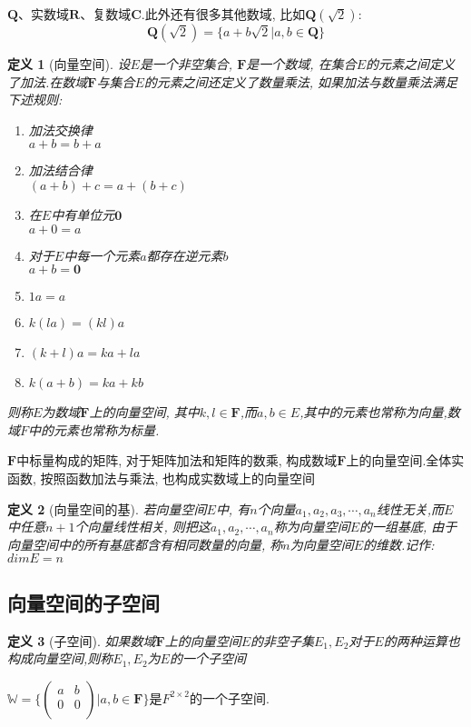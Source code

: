 \documentclass{book}
\newtheorem{definition}{\hspace{2em}定义}[section]
\begin{document}
$\mathbf{Q}$、实数域$\mathbf{R}$、复数域$\mathbf{C}$.此外还有很多其他数域, 比如$\mathbf{Q}(\sqrt{2})$:
\begin{equation*}
  \mathbf{Q}(\sqrt{2})=\{a+b\sqrt{2}|a,b\in\mathbf{Q}\}
\end{equation*}
\begin{definition}[向量空间]
  设$E$是一个非空集合, $\mathbf{F}$是一个数域, 在集合$E$的元素之间定义了加法.在数域$\mathbf{F}$与集合$E$的元素之间还定义了数量乘法, 如果加法与数量乘法满足下述规则:
  \begin{enumerate}[(1)]
    \item 加法交换律\\$a+b=b+a$
    \item 加法结合律\\$(a+b)+c=a+(b+c)$
    \item 在$E$中有单位元$\mathbf{0}$\\$a+0=a$
    \item 对于$E$中每一个元素$a$都存在逆元素$b$\\$a+b=\mathbf{0}$
    \item $1a=a$
    \item $k(la)=(kl)a$
    \item $(k+l)a=ka+la$
    \item $k(a+b)=ka+kb$
  \end{enumerate}
  则称$E$为数域$\mathbf{F}$上的向量空间, 其中$k,l\in \mathbf{F}$,而$a,b\in E$,其中的元素也常称为向量,数域$F$中的元素也常称为标量.
\end{definition}
$\mathbf{F}$中标量构成的矩阵, 对于矩阵加法和矩阵的数乘, 构成数域$\mathbf{F}$上的向量空间.全体实函数, 按照函数加法与乘法, 也构成实数域上的向量空间
\begin{definition}[向量空间的基]
  若向量空间$E$中, 有$n$个向量$a_1,a_2,a_3,\cdots,a_n$线性无关,而$E$中任意$n+1$个向量线性相关, 则把这$a_1,a_2,\cdots,a_n$称为向量空间$E$的一组基底, 由于向量空间中的所有基底都含有相同数量的向量, 称$n$为向量空间$E$的维数.记作:$dimE=n$
\end{definition}
\subsection*{向量空间的子空间}
\begin{definition}[子空间]
  如果数域$\mathbf{F}$上的向量空间$E$的非空子集$E_1,E_2$对于$E$的两种运算也构成向量空间,则称$E_1,E_2$为$E$的一个子空间
\end{definition}
$\mathbb{W}=\{\begin{pmatrix}
                       a & b \\
                       0 & 0 \\
                     \end{pmatrix}
|a,b\in \mathbf{F}\}$是$F^{2\times 2}$的一个子空间.
\end{document}
